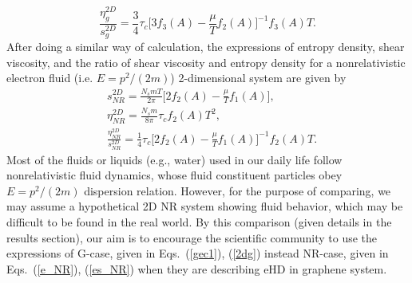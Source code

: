 \documentclass[%
 reprint,
 amsmath,amssymb,
 aps,
]{revtex4-2}
\begin{document}
    \begin{equation}
    \frac{\eta_{g}^{2D}}{ s_{g}^{2D}} = \frac{3 }{4}\tau_c \Bigg[3f_3\left(A\right) - \frac{\mu}{T} f_2\left(A\right) \Bigg]^{-1} f_3\left(A\right) T.
    \label{2dg}
    \end{equation}
%
    After doing a similar way of calculation, the expressions of entropy density, shear viscosity, and the ratio of shear viscosity and entropy density for a nonrelativistic electron fluid (i.e. $E=p^2/(2m)$) 2-dimensional system are given by
    \begin{align}
    & s_{NR}^{2D} = \frac{N_s m T}{2 \pi } \Bigg[2f_2\left(A\right) - \frac{\mu}{T} f_1\left(A\right) \Bigg],
    \label{pure1}\\
    & \eta_{NR}^{2D} = \frac{N_s m }{8 \pi}\tau_c f_2\left(A\right) T^2,
    \label{e_NR}\\
    & \frac{\eta_{NR}^{2D}}{ s_{NR}^{2D}} = \frac{1}{4} \tau_c \Bigg[2f_2\left(A\right) - \frac{\mu}{T} f_1\left(A\right) \Bigg]^{-1} f_2\left(A\right) T.
    \label{es_NR}
    \end{align}
    Most of the fluids or liquids (e.g., water) used in our daily life follow nonrelativistic fluid dynamics, whose fluid constituent particles obey $E=p^2/(2m)$ dispersion relation. However, for the purpose of comparing, we may assume a hypothetical 2D NR system showing fluid behavior, which may be difficult to be found in the real world. By this comparison (given details in the results section), our aim is to encourage the scientific community to use the expressions of G-case, given in Eqs.~(\ref{gec1}), (\ref{2dg}) instead NR-case, given in Eqs.~(\ref{e_NR}), (\ref{es_NR}) when they are describing eHD in graphene system.
%
\end{document}
